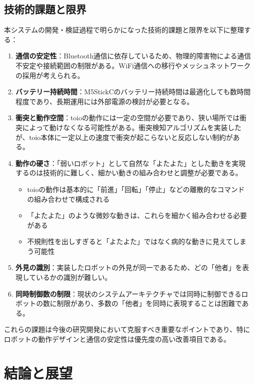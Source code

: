 \documentclass{cuxarticle}
\begin{document}
\section{技術的課題と限界}
本システムの開発・検証過程で明らかになった技術的課題と限界を以下に整理する：

\begin{enumerate}
  \item \textbf{通信の安定性}：Bluetooth通信に依存しているため、物理的障害物による通信不安定や接続範囲の制限がある。WiFi通信への移行やメッシュネットワークの採用が考えられる。

  \item \textbf{バッテリー持続時間}：M5StickCのバッテリー持続時間は最適化しても数時間程度であり、長期運用には外部電源の検討が必要となる。

  \item \textbf{衝突と動作空間}：toioの動作には一定の空間が必要であり、狭い場所では衝突によって動けなくなる可能性がある。衝突検知アルゴリズムを実装したが、toio本体に一定以上の速度で衝突が起こらないと反応しない制約がある。

  \item \textbf{動作の硬さ}：「弱いロボット」として自然な「よたよた」とした動きを実現するのは技術的に難しく、細かい動きの組み合わせと調整が必要である。
    \begin{itemize}
      \item toioの動作は基本的に「前進」「回転」「停止」などの離散的なコマンドの組み合わせで構成される
      \item 「よたよた」のような微妙な動きは、これらを細かく組み合わせる必要がある
      \item 不規則性を出しすぎると「よたよた」ではなく病的な動きに見えてしまう可能性
    \end{itemize}

  \item \textbf{外見の識別}：実装したロボットの外見が同一であるため、どの「他者」を表現しているかの識別が難しい。

  \item \textbf{同時制御数の制限}：現状のシステムアーキテクチャでは同時に制御できるロボットの数に制限があり、多数の「他者」を同時に表現することは困難である。
\end{enumerate}

これらの課題は今後の研究開発において克服すべき重要なポイントであり、特にロボットの動作デザインと通信の安定性は優先度の高い改善項目である。

\chapter{結論と展望}
\end{document}
